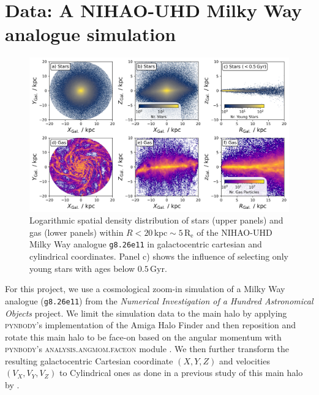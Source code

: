 \documentclass[fleqn,usenatbib]{mnras}
\newcommand{\nihaoAGEmax}{$0.5\,\mathrm{Gyr}$}
\begin{document}
\section{Data: A NIHAO-UHD Milky Way analogue simulation} \label{sec:data}

\begin{figure}
    \centering
    \includegraphics[width=\textwidth]{figures/stars_and_gas_overview.png}
    \caption{Logarithmic spatial density distribution of stars (upper panels) and gas (lower panels) within $R < 20\,\mathrm{kpc} \sim 5\,\mathrm{R_e}$ of the NIHAO-UHD Milky Way analogue \texttt{g8.26e11} in galactocentric cartesian and cylindrical coordinates. Panel c) shows the influence of selecting only young stars with ages below \nihaoAGEmax.}
    \label{fig:stars_and_gas_overview}
\end{figure}

For this project, we use a cosmological zoom-in simulation of a Milky Way analogue (\texttt{g8.26e11}) from the \textit{Numerical Investigation of a Hundred Astronomical Objects} \citep[NIHAO,][]{Wang2015} project. We limit the simulation data to the main halo by applying \textsc{pynbody}'s implementation of the Amiga Halo Finder \citep{Knollman2009} and then reposition and rotate this main halo to be face-on based on the angular momentum with \textsc{pynbody}'s \textsc{analysis.angmom.faceon} module \citep{pynbody}. We then further transform the resulting galactocentric Cartesian coordinate $(X,Y,Z)$ and velocities $(V_X,V_Y,V_Z)$ to Cylindrical ones as done in a previous study of this main halo by \citet{Buder2024}.
\end{document}

